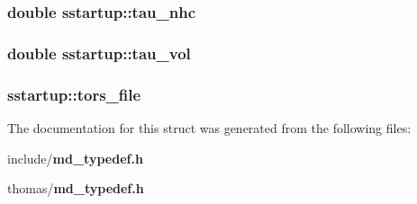 \subsubsection{\setlength{\rightskip}{0pt plus 5cm}double {\bf sstartup::tau\_\-nhc}}\label{structsstartup_02fb59cee2b9adb1e5cb4e771d45997d}


\subsubsection{\setlength{\rightskip}{0pt plus 5cm}double {\bf sstartup::tau\_\-vol}}\label{structsstartup_2afff89b675709159264c6e19c11b51c}


\subsubsection{ {\bf sstartup::tors\_\-file}}\label{structsstartup_954e19e2a0a3564396d4202f274b9d1e}




The documentation for this struct was generated from the following files:\begin{CompactItemize}
\item 
include/{\bf md\_\-typedef.h}\item 
thomas/{\bf md\_\-typedef.h}\end{CompactItemize}
